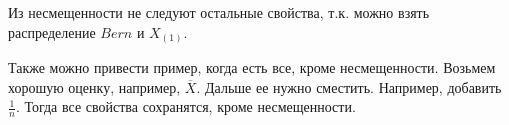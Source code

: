 \begin{example}
Из несмещенности не следуют остальные свойства, т.к. можно взять распределение $Bern$ и $X_{(1)}$.

Также можно привести пример, когда есть все, кроме несмещенности. Возьмем хорошую оценку, например, $\overline{X}$. Дальше ее нужно сместить. Например, добавить $\frac{1}{n}$. Тогда все свойства сохранятся, кроме несмещенности.
\end{example}
